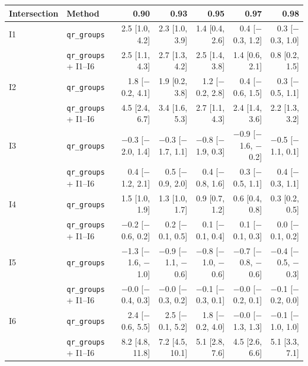 \setlength{\tabcolsep}{3.4pt}
\begin{tabular}{@{}llrrrrr@{}}
\toprule
Intersection & Method & 0.90 & 0.93 & 0.95 & 0.97 & 0.98 \\
\midrule
I1 & \texttt{qr\_groups} & 2.5 [1.0, 4.2] & 2.3 [1.0, 3.9] & 1.4 [0.4, 2.6] & 0.4 [$-$0.3, 1.2] & 0.3 [$-$0.3, 1.0] \\
 & \texttt{qr\_groups} + I1--I6 & 2.5 [1.1, 4.3] & 2.7 [1.3, 4.2] & 2.5 [1.4, 3.8] & 1.4 [0.6, 2.1] & 0.8 [0.2, 1.5] \\
\addlinespace
I2 & \texttt{qr\_groups} & 1.8 [$-$0.2, 4.1] & 1.9 [0.2, 3.8] & 1.2 [$-$0.2, 2.8] & 0.4 [$-$0.6, 1.5] & 0.3 [$-$0.5, 1.1] \\
 & \texttt{qr\_groups} + I1--I6 & 4.5 [2.4, 6.7] & 3.4 [1.6, 5.3] & 2.7 [1.1, 4.3] & 2.4 [1.4, 3.6] & 2.2 [1.3, 3.2] \\
\addlinespace
I3 & \texttt{qr\_groups} & $-$0.3 [$-$2.0, 1.4] & $-$0.3 [$-$1.7, 1.1] & $-$0.8 [$-$1.9, 0.3] & $-$0.9 [$-$1.6, $-$0.2] & $-$0.5 [$-$1.1, 0.1] \\
 & \texttt{qr\_groups} + I1--I6 & 0.4 [$-$1.2, 2.1] & 0.5 [$-$0.9, 2.0] & 0.4 [$-$0.8, 1.6] & 0.3 [$-$0.5, 1.1] & 0.4 [$-$0.3, 1.1] \\
\addlinespace
I4 & \texttt{qr\_groups} & 1.5 [1.0, 1.9] & 1.3 [1.0, 1.7] & 0.9 [0.7, 1.2] & 0.6 [0.4, 0.8] & 0.3 [0.2, 0.5] \\
 & \texttt{qr\_groups} + I1--I6 & $-$0.2 [$-$0.6, 0.2] & 0.2 [$-$0.1, 0.5] & 0.1 [$-$0.1, 0.4] & 0.1 [$-$0.1, 0.3] & 0.0 [$-$0.1, 0.2] \\
\addlinespace
I5 & \texttt{qr\_groups} & $-$1.3 [$-$1.6, $-$1.0] & $-$0.9 [$-$1.1, $-$0.6] & $-$0.8 [$-$1.0, $-$0.6] & $-$0.7 [$-$0.8, $-$0.6] & $-$0.4 [$-$0.5, $-$0.3] \\
 & \texttt{qr\_groups} + I1--I6 & $-$0.0 [$-$0.4, 0.3] & $-$0.0 [$-$0.3, 0.2] & $-$0.1 [$-$0.3, 0.1] & $-$0.0 [$-$0.2, 0.1] & $-$0.1 [$-$0.2, 0.0] \\
\addlinespace
I6 & \texttt{qr\_groups} & 2.4 [$-$0.6, 5.5] & 2.5 [$-$0.1, 5.2] & 1.8 [$-$0.2, 4.0] & $-$0.0 [$-$1.3, 1.3] & $-$0.1 [$-$1.0, 1.0] \\
 & \texttt{qr\_groups} + I1--I6 & 8.2 [4.8, 11.8] & 7.2 [4.5, 10.1] & 5.1 [2.8, 7.6] & 4.5 [2.6, 6.6] & 5.1 [3.3, 7.1] \\
\bottomrule
\end{tabular}
